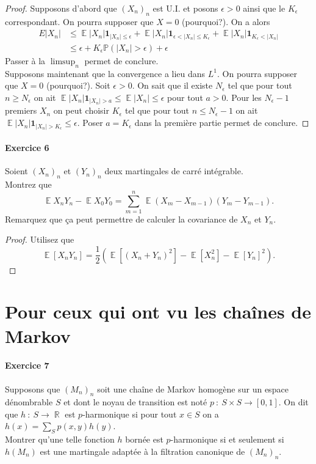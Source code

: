 \documentclass{article}
\theoremstyle{definition}
\numberwithin{equation}{section}
\DeclareMathOperator{\R}{\mathbb{R}}
\DeclareMathOperator{\E}{\mathbb{E}}
\begin{document}
\begin{proof}
Supposons d'abord que $(X_n)_n$ est U.I. et posons $\epsilon>0$ ainsi que le $K_\epsilon$ correspondant. On pourra supposer que $X=0$ (pourquoi?). On a alors
\begin{align*}
E|X_n| &\leq \E|X_n|\mathbf{1}_{|X_n|\leq \epsilon} + \E|X_n|\mathbf{1}_{\epsilon < |X_n|\leq K_\epsilon} + \E|X_n|\mathbf{1}_{K_\epsilon<|X_n|}\\
&\leq \epsilon + K_\epsilon \mathbb{P}(|X_n|>\epsilon) + \epsilon
\end{align*}
Passer à la $\limsup_n$ permet de conclure.\\
Supposons maintenant que la convergence a lieu dans $L^1$. On pourra supposer que $X=0$ (pourquoi?). Soit $\epsilon>0$. On sait que il existe $N_\epsilon$ tel que pour tout $n\geq N_\epsilon$ on ait $\E|X_n|\mathbf{1}_{|X_n|>a}\leq\E|X_n|\leq \epsilon$ pour tout $a>0$. Pour les $N_\epsilon-1$ premiers $X_n$ on peut choisir $K_\epsilon$ tel que pour tout $n\leq N_\epsilon-1$ on ait $\E|X_n|\mathbf{1}_{|X_n|>K_\epsilon}\leq \epsilon$. Poser $a=K_\epsilon$ dans la première partie permet de conclure.
\end{proof}


\paragraph{Exercice 6}
Soient $(X_n)_n$ et $(Y_n)_n$ deux martingales de carré intégrable.\\
Montrez que 
$$ \E X_nY_n - \E X_0Y_0 = \sum_{m=1}^n \E(X_m-X_{m-1})(Y_m-Y_{m-1}). $$
Remarquez que ça peut permettre de calculer la covariance de $X_n$ et $Y_n$.

\begin{proof}
Utilisez que 
$$\E[X_nY_n] = \dfrac{1}{2}\left(\E[(X_n+Y_n)^2]-\E[X_n^2]-\E[Y_n]^2\right).$$
\end{proof}

\section{Pour ceux qui ont vu les chaînes de Markov}

\paragraph{Exercice 7} 
Supposons que $(M_n)_n$ soit une chaîne de Markov homogène sur un espace dénombrable $S$ et dont le noyau de transition est noté $p~:~S\times S\to [0,1]$. On dit que $h~:~S\to \R$ est $p$-harmonique si pour tout $x\in S$ on a $h(x)=\sum_S p(x,y)h(y)$.\\
Montrer qu'une telle fonction $h$ bornée est $p$-harmonique si et seulement si $h(M_n)$ est une martingale adaptée à la filtration canonique de $(M_n)_n$.
\end{document}
